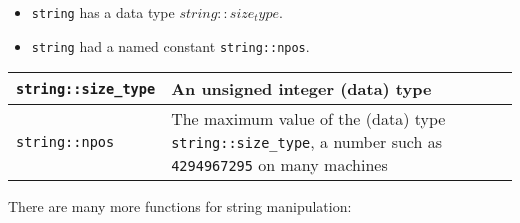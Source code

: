 \documentclass{article}
\begin{document}
\begin{itemize}
  \item \texttt{string} has a data type \texttt{$string::size_type$}.
  \item \texttt{string} had a named constant \texttt{string::npos}.
\end{itemize}

\begin{tabular}{|l|p{8.3cm}|}
\hline
\texttt{string::size\_type} & An unsigned integer (data) type \\ \hline
\texttt{string::npos} & The maximum value of the (data) type \texttt{string::size\_type}, a number such as \texttt{4294967295} on many machines \\ \hline
\end{tabular}

\vspace{8pt}
There are many more functions for string manipulation:

\end{document}
